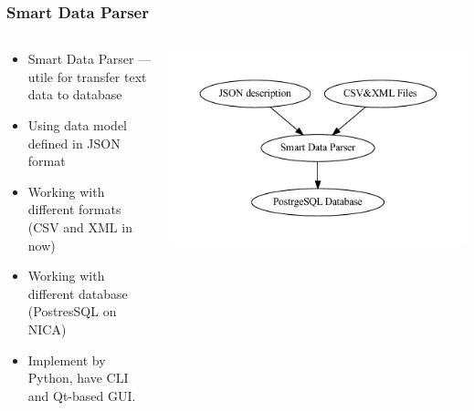 \documentclass[8pt,pdf,hyperref={unicode}]{beamer}
\begin{document}
\begin{frame}
	\frametitle{Smart Data Parser}
	\begin{columns}
		\begin{column}{0.5\linewidth}
			\begin{itemize}
				\item Smart Data Parser --- utile for transfer text data to database
				\item Using data model defined in JSON format
				\item Working with different formats (CSV and XML in now)
				\item Working with different database (PostresSQL on NICA)
				\item Implement by Python, have CLI and Qt-based GUI. 
			\end{itemize}
		\end{column}
		\begin{column}{0.5\linewidth}
			\includegraphics[width=\linewidth]{image/schema_1.dot.pdf}
		\end{column}
	\end{columns}
\end{frame}
\end{document}
